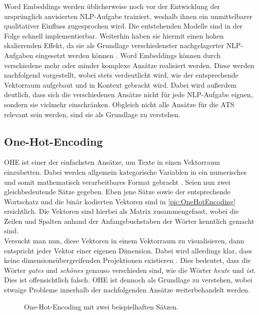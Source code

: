 \noindent
Word Embeddings werden üblicherweise noch vor der Entwicklung der ursprünglich anvisierten \ac{NLP}-Aufgabe trainiert, weshalb ihnen ein unmittelbarer qualitativer Einfluss zugesprochen wird. Die entstehenden Modelle sind in der Folge schnell implementierbar. Weiterhin haben sie hiermit einen hohen skalierenden Effekt, da sie als Grundlage verschiedenster nachgelagerter \ac{NLP}-Aufgaben eingesetzt werden können \cite{NIT19}. Word Embeddings können durch verschiedene mehr oder minder komplexe Ansätze realisiert werden. Diese werden nachfolgend vorgestellt, wobei stets verdeutlicht wird, wie der entsprechende Vektorraum aufgebaut und in Kontext gebracht wird. Dabei wird außerdem deutlich, dass sich die verschiedenen Ansätze nicht für jede \ac{NLP}-Aufgabe eignen, sondern sie vielmehr einschränken. Obgleich nicht alle Ansätze für die \ac{ATS} relevant sein werden, sind sie als Grundlage zu verstehen.
\newpage


\subsection{One-Hot-Encoding}
\noindent
\ac{OHE} ist einer der einfachsten Ansätze, um Texte in einen Vektorraum einzubetten. Dabei werden allgemein kategorische Variablen in ein numerisches und somit mathematisch verarbeitbares Format gebracht \cite{KAR18}. Seien nun zwei gleichbedeutende Sätze gegeben. Eben jene Sätze sowie der entsprechende Wortschatz und die binär kodierten Vektoren sind in \autoref{pic:OneHotEncoding} ersichtlich. Die Vektoren sind hierbei als Matrix zusammengefasst, wobei die Zeilen und Spalten anhand der Anfangsbuchstaben der Wörter kenntlich gemacht sind.\\

\noindent
Versucht man nun, diese Vektoren in einem Vektorraum zu visualisieren, dann entspricht jeder Vektor einer eigenen Dimension. Dabei wird allerdings klar, dass keine dimensionsübergreifenden Projektionen existieren \cite{KAR18}. Dies bedeutet, dass die Wörter \textit{gutes} und \textit{schönes} genauso verschieden sind, wie die Wörter \textit{heute} und \textit{ist}. Dies ist offensichtlich falsch. \ac{OHE} ist dennoch als Grundlage zu verstehen, wobei etwaige Probleme innerhalb der nachfolgenden Ansätze weiterbehandelt werden.

\begin{figure}[h!]
  \centering
  \caption{One-Hot-Encoding mit zwei beispielhaften Sätzen.}
  \label{pic:OneHotEncoding}
\end{figure}


